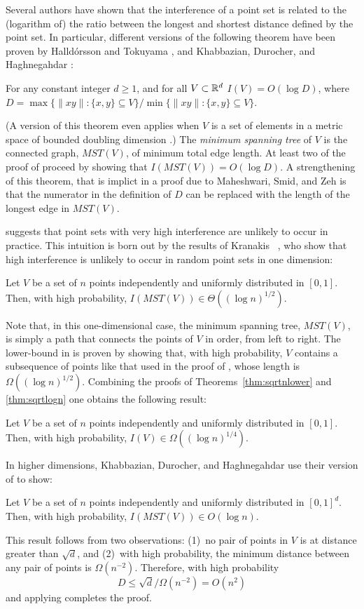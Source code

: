 \documentclass{patmorin}
\newcommand{\mst}{\mathit{MST}}
\begin{document}
Several authors have shown that the interference of a point set is
related to the (logarithm of) the ratio between the longest and shortest
distance defined by the point set.  In particular, different versions
of the following theorem have been proven by Halld\'orsson and Tokuyama
\cite{ht08}, and Khabbazian, Durocher, and Haghnegahdar
\cite{kdh11}:
\begin{thm}
  For any constant integer $d\ge 1$, and for all $V\subset\mathbb{R}^d$
  $I(V)=O(\log D)$, where $D=\max\{\|xy\|: \{x,y\}\subseteq V\}/\min\{\|xy\|:
  \{x,y\}\subseteq V\}$.
\end{thm}
(A version of this theorem even applies when $V$ is a set of elements
in a metric space of bounded doubling dimension \cite{msz11}.)  The
\emph{minimum spanning tree} of $V$ is the connected graph, $\mst(V)$,
of minimum total edge length.  At least two of the proof of 
proceed by showing that $I(\mst(V))=O(\log D)$.  A strengthening of
this theorem, that is implict in a proof due to Maheshwari, Smid, and
Zeh \cite{msz11} is that the numerator in the definition of $D$ can be
replaced with the length of the longest edge in $\mst(V)$.

 suggests that point sets with very high interference are
unlikely to occur in practice.  This intuition is born out by the results
of Kranakis \etal\ \cite{kkmns10}, who show that high interference is
unlikely to occur in random point sets in one dimension:
\begin{thm}
  Let $V$ be a set of $n$ points independently and uniformly distributed
  in $[0,1]$.  Then, with high probability, $I(\mst(V))\in \Theta((\log
  n)^{1/2})$.
\end{thm}
Note that, in this one-dimensional case, the minimum spanning tree,
$\mst(V)$, is simply a path that connects the points of $V$ in order,
from left to right.  The lower-bound in  is proven
by showing that, with high probability, $V$ contains a subsequence
of points like that used in the proof of ,
whose length is $\Omega((\log n)^{1/2})$.  Combining the proofs of
Theorems~\ref{thm:sqrtnlower} and \ref{thm:sqrtlogn} one obtains the
following result:
\begin{thm}
  Let $V$ be a set of $n$ points independently and uniformly distributed
  in $[0,1]$.  Then, with high probability, $I(V)\in \Omega((\log
  n)^{1/4})$.
\end{thm}

In higher dimensions, Khabbazian, Durocher, and Haghnegahdar use their
version of  to show:
\begin{thm}
  Let $V$ be a set of $n$ points independently and uniformly distributed
  in $[0,1]^d$.  Then, with high probability, $I(\mst(V))\in O(\log n)$.
\end{thm}
This result follows from two observations: (1)~no pair of points in $V$
is at distance greater than $\sqrt{d}$, and (2)~with high probability,
the minimum distance between any pair of points is $\Omega(n^{-2})$.  Therefore,
with high probability
\[
   D \le \sqrt{d}/\Omega(n^{-2}) = O(n^2)
\]
and applying  completes the proof.
\end{document}
